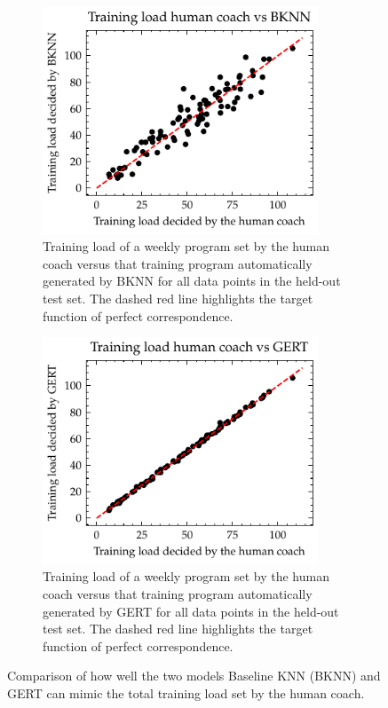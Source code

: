 \begin{figure}[t]
    \centering
    \begin{subfigure}{0.45\textwidth}
        \centering
        \includegraphics[width=0.9\textwidth]{chapters/figures/result/result_total_load_BKNN_vs_coach.pdf}
        \captionsetup{width=.9\linewidth}
        \caption{Training load of a weekly program set by the human coach versus that training program automatically generated by BKNN for all data points in the held-out test set. The dashed red line highlights the target function of perfect correspondence.}
        \label{subfig:BKNN_pred}
    \end{subfigure}
    \begin{subfigure}{0.45\textwidth}
        \centering
        \includegraphics[width=0.9\textwidth]{chapters/figures/result/result_total_load_GERT_vs_coach.pdf}
        \captionsetup{width=.9\linewidth}
        \caption{Training load of a weekly program set by the human coach versus that training program automatically generated by GERT for all data points in the held-out test set. The dashed red line highlights the target function of perfect correspondence.}
        \label{subfig:GERT_pred}
    \end{subfigure}
    \caption{Comparison of how well the two models Baseline KNN (BKNN) and GERT can mimic the total training load set by the human coach.
    }
    \label{fig:preds}
\end{figure}

